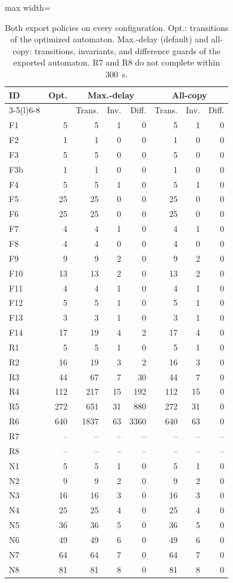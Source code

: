 \begin{table}[t]
\centering
\caption{Both export policies on every configuration. Opt.: transitions of the optimized automaton. Max.-delay (default) and all-copy: transitions, invariants, and difference guards of the exported automaton. R7 and R8 do not complete within 300~s.}
\label{tab:export-policies}
\scriptsize\setlength{\tabcolsep}{4pt}
\begin{adjustbox}{max width=\textwidth}\begin{tabular}{@{}lrrrrrrr@{}}
\toprule
ID & Opt. & \multicolumn{3}{c}{Max.-delay} & \multicolumn{3}{c}{All-copy}\\
\cmidrule(lr){3-5}\cmidrule(l){6-8}
& & Trans. & Inv. & Diff. & Trans. & Inv. & Diff.\\
\midrule
F1 & 5 & 5 & 1 & 0 & 5 & 1 & 0\\
F2 & 1 & 1 & 0 & 0 & 1 & 0 & 0\\
F3 & 5 & 5 & 0 & 0 & 5 & 0 & 0\\
F3b & 1 & 1 & 0 & 0 & 1 & 0 & 0\\
F4 & 5 & 5 & 1 & 0 & 5 & 1 & 0\\
F5 & 25 & 25 & 0 & 0 & 25 & 0 & 0\\
F6 & 25 & 25 & 0 & 0 & 25 & 0 & 0\\
F7 & 4 & 4 & 1 & 0 & 4 & 1 & 0\\
F8 & 4 & 4 & 0 & 0 & 4 & 0 & 0\\
F9 & 9 & 9 & 2 & 0 & 9 & 2 & 0\\
F10 & 13 & 13 & 2 & 0 & 13 & 2 & 0\\
F11 & 4 & 4 & 1 & 0 & 4 & 1 & 0\\
F12 & 5 & 5 & 1 & 0 & 5 & 1 & 0\\
F13 & 3 & 3 & 1 & 0 & 3 & 1 & 0\\
F14 & 17 & 19 & 4 & 2 & 17 & 4 & 0\\
R1 & 5 & 5 & 1 & 0 & 5 & 1 & 0\\
R2 & 16 & 19 & 3 & 2 & 16 & 3 & 0\\
R3 & 44 & 67 & 7 & 30 & 44 & 7 & 0\\
R4 & 112 & 217 & 15 & 192 & 112 & 15 & 0\\
R5 & 272 & 651 & 31 & 880 & 272 & 31 & 0\\
R6 & 640 & 1837 & 63 & 3360 & 640 & 63 & 0\\
R7 & -- & -- & -- & -- & -- & -- & --\\
R8 & -- & -- & -- & -- & -- & -- & --\\
N1 & 5 & 5 & 1 & 0 & 5 & 1 & 0\\
N2 & 9 & 9 & 2 & 0 & 9 & 2 & 0\\
N3 & 16 & 16 & 3 & 0 & 16 & 3 & 0\\
N4 & 25 & 25 & 4 & 0 & 25 & 4 & 0\\
N5 & 36 & 36 & 5 & 0 & 36 & 5 & 0\\
N6 & 49 & 49 & 6 & 0 & 49 & 6 & 0\\
N7 & 64 & 64 & 7 & 0 & 64 & 7 & 0\\
N8 & 81 & 81 & 8 & 0 & 81 & 8 & 0\\
\bottomrule
\end{tabular}\end{adjustbox}
\end{table}
